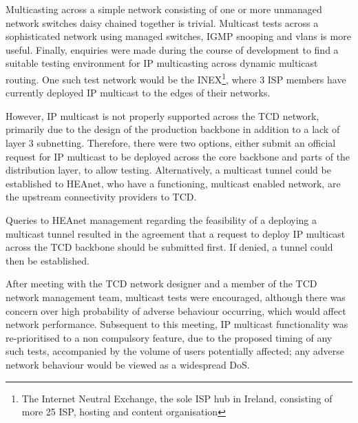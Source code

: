 Multicasting across a simple network consisting of one or 
more unmanaged network switches daisy chained together is trivial. 
Multicast tests across a sophisticated network using managed
switches, IGMP snooping and vlans is more useful. Finally, enquiries
were made during the course of development to find a suitable testing
environment for IP multicasting across dynamic multicast routing. One
such test network would be the INEX\footnote{The Internet Neutral
Exchange, the sole ISP hub in Ireland, consisting of more
25 ISP, hosting and content organisation}, where 3 ISP members 
have currently deployed IP multicast to the edges of their networks.


However, IP multicast is not properly supported across the 
TCD network, primarily due to the design of the production backbone in 
addition to a lack of layer 3 subnetting. Therefore, there were two 
options, either submit an official request for IP multicast to be 
deployed across the core backbone and parts of the distribution layer, 
to allow testing. Alternatively, a multicast tunnel could be established
to HEAnet, who have a functioning, multicast enabled network, are the 
upstream connectivity providers to TCD. 


Queries to HEAnet management regarding the feasibility of a deploying
a multicast tunnel resulted in the agreement that a request to deploy IP
multicast across the TCD backbone should be submitted first. If denied,
a tunnel could then be established. 


After meeting with the TCD network designer and a member of the TCD 
network management team, multicast tests were encouraged, although 
there was concern over high probability of adverse behaviour occurring, 
which would affect network performance. Subsequent to this meeting, 
IP multicast functionality was re-prioritised to a non compulsory
feature, due to the proposed timing of any such tests, accompanied by 
the volume of users potentially affected; any adverse network behaviour 
would be viewed as a widespread DoS. 
